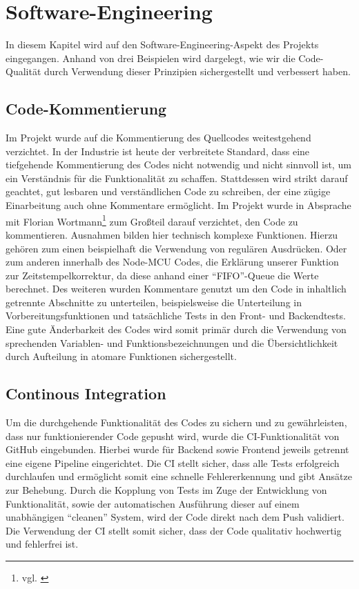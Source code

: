 

\section{Software-Engineering}
In diesem Kapitel wird auf den Software-Engineering-Aspekt des Projekts eingegangen. Anhand von drei Beispielen wird dargelegt, wie wir die Code-Qualität durch Verwendung dieser Prinzipien sichergestellt und verbessert haben.
\subsection*{Code-Kommentierung}
Im Projekt wurde auf die Kommentierung des Quellcodes weitestgehend verzichtet.
In der Industrie ist heute der verbreitete Standard, dass eine tiefgehende Kommentierung des Codes nicht notwendig und nicht sinnvoll ist, um ein Verständnis für die Funktionalität zu schaffen.
Stattdessen wird strikt darauf geachtet, gut lesbaren und verständlichen Code zu schreiben, der eine zügige Einarbeitung auch ohne Kommentare ermöglicht.
Im Projekt wurde in Absprache mit Florian Wortmann\footnote{vgl. \cite{BesprNotiz.2020}} zum Großteil darauf verzichtet, den Code zu kommentieren.
Ausnahmen bilden hier technisch komplexe Funktionen.
Hierzu gehören zum einen beispielhaft die Verwendung von regulären Ausdrücken.
Oder zum anderen innerhalb des Node-MCU Codes, die Erklärung unserer Funktion zur Zeitstempelkorrektur, da diese anhand einer \enquote{FIFO}-Queue die Werte berechnet.
Des weiteren wurden Kommentare genutzt um den Code in inhaltlich getrennte Abschnitte zu unterteilen, beispielsweise die Unterteilung in Vorbereitungsfunktionen und tatsächliche Tests in den Front- und Backendtests.
Eine gute Änderbarkeit des Codes wird somit primär durch die Verwendung von sprechenden Variablen- und Funktionsbezeichnungen und die Übersichtlichkeit durch Aufteilung in atomare Funktionen sichergestellt.
\subsection*{Continous Integration}
Um die durchgehende Funktionalität des Codes zu sichern und zu gewährleisten, dass nur funktionierender Code gepusht wird, wurde die CI-Funktionalität von GitHub eingebunden.
Hierbei wurde für Backend sowie Frontend jeweils getrennt eine eigene Pipeline eingerichtet.
Die CI stellt sicher, dass alle Tests erfolgreich durchlaufen und ermöglicht somit eine schnelle Fehlererkennung und gibt Ansätze zur Behebung.
Durch die Kopplung von Tests im Zuge der Entwicklung von Funktionalität, sowie der automatischen Ausführung dieser auf einem unabhängigen \enquote{cleanen} System, wird der Code direkt nach dem Push validiert.
Die Verwendung der CI stellt somit sicher, dass der Code qualitativ hochwertig und fehlerfrei ist.
